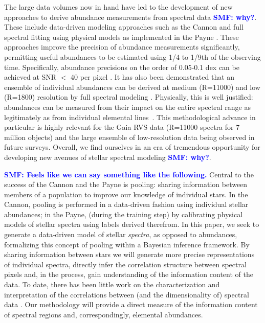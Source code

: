 \documentclass[a4paper,fleqn,usenatbib]{mnras}
\newcommand{\smf}[1]{\textbf{\textcolor{blue}{SMF: #1}}}
\begin{document}
The large data volumes now in hand have led to the development of new approaches to derive abundance measurements from spectral data \smf{why?}. These include data-driven modeling approaches such as the Cannon \citep{Ness2015} and full spectral fitting using physical models as implemented in the Payne \citep{Ting2018}. These approaches improve the precision of abundance measurements significantly, permitting useful abundances to be estimated using 1/4 to 1/9th of the observing time. Specifically, abundance precisions on the order of 0.05-0.1 dex can be achieved at SNR $<$ 40 per pixel \citep{Ness2018,Ting2018,Ho2017b}. It has also been demonstrated that an ensemble of individual abundances can be derived at medium (R=11000) and low (R=1800) resolution by full spectral modeling \citep[e.g.][and Wheeler et al., in prep]{Casey2016, Ting2017}. Physically, this is well justified: abundances can be measured from their impact on the entire spectral range as legitimately as from individual elemental lines~\citep[e.g.][]{Ting2018}. This methodological advance in particular is highly relevant for the Gaia RVS data (R=11000 spectra for 7 million objects) and the large ensemble of low-resolution data being observed in future surveys. Overall, we find ourselves in an era of tremendous opportunity for developing new avenues of stellar spectral modeling \smf{why?}.

\smf{Feels like we can say something like the following.} Central to the success of the Cannon and the Payne is pooling: sharing information between members of a population to improve our knowledge of individual stars. In the Cannon, pooling is performed in a data-driven fashion using individual stellar abundances; in the Payne, (during the training step) by calibrating physical models of stellar spectra using labels derived therefrom. In this paper, we seek to generate a data-driven model of stellar {\it spectra}, as opposed to abundances, formalizing this concept of pooling within a Bayesian inference framework. By sharing information between stars we will generate more precise representations of individual spectra, directly infer the correlation structure between spectral pixels and, in the process, gain understanding of the information content of the data. To date, there has been little work on the characterization and interpretation of the correlations between (and the dimensionality of) spectral data \citep[see however][]{Ting2012, PJ2019, M2014}. Our methodology will provide a direct measure of the information content of spectral regions and, correspondingly, elemental abundances.
\end{document}
